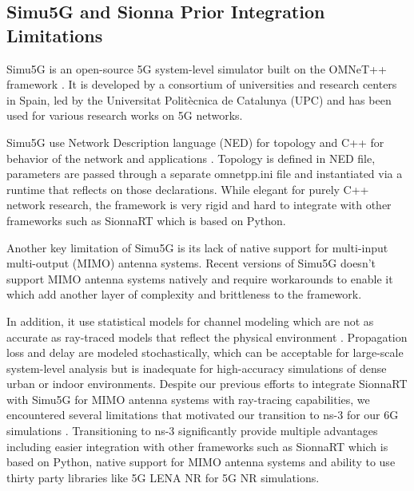\subsection{Simu5G and Sionna Prior Integration Limitations}
Simu5G is an open-source 5G system-level simulator built on the OMNeT++ framework \cite{omnet,simu5g}. It is developed by a consortium of universities and research centers in Spain, led by the Universitat Politècnica de Catalunya (UPC) and has been used for various research works on 5G networks.

Simu5G use Network Description language (NED) for topology and C++ for behavior of the network and applications \cite{omnet,simu5g}. Topology is defined in NED file, parameters are passed through a separate omnetpp.ini file and instantiated via a runtime that reflects on those declarations.
While elegant for purely C++ network research, the framework is very rigid and hard to integrate with other frameworks such as SionnaRT which is based on Python.

Another key limitation of Simu5G is its lack of native support for multi-input multi-output (MIMO) antenna systems.
Recent versions of Simu5G doesn’t support MIMO antenna systems natively and require workarounds to enable it which
add another layer of complexity and brittleness to the framework.

In addition, it use statistical models for channel modeling which are not as accurate as ray-traced models that reflect the physical environment \cite{simu5g,alsamman_mmwave,han_thz}. Propagation loss and delay are modeled stochastically, which can be acceptable
for large-scale system-level analysis but is inadequate for high-accuracy simulations of dense urban or indoor environments.
Despite our previous efforts to integrate SionnaRT with Simu5G for MIMO antenna systems with ray-tracing capabilities, we encountered several limitations that motivated our transition to ns-3 for our 6G simulations \cite{simu5g,sionna,sionnart,ns3,5glena}.
Transitioning to ns-3 significantly provide multiple advantages including easier integration with other frameworks such as SionnaRT which is based on Python, native support for MIMO antenna systems and ability to use thirty party libraries like 5G LENA NR for 5G NR simulations.
